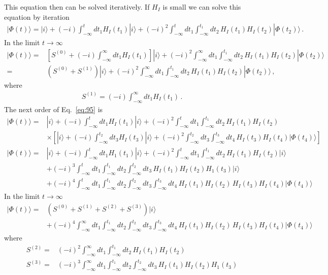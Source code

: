 This equation then can  be solved iteratively. If $H_I$ is small we can solve this equation by iteration
\begin{align}
\label{eq:95}
  |\Phi(t)\rangle=|i\rangle+(-i)\int_{-\infty}^t d t_1 H_I(t_1)|i\rangle+(-i)^2\int_{-\infty}^t d t_1\int_{-\infty}^{t_1} d t_2\,H_I(t_1)H_I(t_2)|\Phi(t_2)\rangle\,.
\end{align}
In the limit $t\to\infty$
\begin{align}
  |\Phi(t)\rangle=&\left[S^{(0)}+(-i)\int_{-\infty}^\infty d t_1 H_I(t_1)\right]|i\rangle+(-i)^2\int_{-\infty}^\infty d t_1\int_{-\infty}^{t_1} d t_2\,H_I(t_1)H_I(t_2)|\Phi(t_2)\rangle\nonumber\\
  =&\left(S^{(0)}+S^{(1)}\right)|i\rangle+(-i)^2\int_{-\infty}^\infty d t_1\int_{-\infty}^{t_1} d t_2\,H_I(t_1)H_I(t_2)|\Phi(t_2)\rangle\,,
\end{align}
where 
\begin{align}
  S^{(1)}=(-i)\int_{-\infty}^\infty d t_1 H_I(t_1)\,.
\end{align}
The next order of Eq.~\eqref{eq:95} is
\begin{align}
  |\Phi(t)\rangle=&|i\rangle+(-i)\int_{-\infty}^t d t_1 H_I(t_1)|i\rangle+(-i)^2\int_{-\infty}^t d t_1\int_{-\infty}^{t_1} d t_2\,H_I(t_1)H_I(t_2)\nonumber\\
  &\times\left[|i\rangle+(-i)\int_{-\infty}^{t_2} d t_3 H_I(t_3)|i\rangle+(-i)^2\int_{-\infty}^{t_2} d t_3\int_{-\infty}^{t_3} d t_4\,H_I(t_3)H_I(t_4)|\Phi(t_4)\rangle\right]
\end{align}
\begin{align}
  |\Phi(t)\rangle=&|i\rangle+(-i)\int_{-\infty}^t d t_1 H_1(t_1)|i\rangle+(-i)^2\int_{-\infty}^t d t_1\int_{-\infty}^{t_1} d t_2\,H_I(t_1)H_I(t_2)|i\rangle\nonumber\\
  &+(-i)^3\int_{-\infty}^t d t_1\int_{-\infty}^{t_1} d t_2\int_{-\infty}^{t_2} d t_3\,H_I(t_1)H_I(t_2) H_1(t_3)|i\rangle\nonumber\\
  &+(-i)^4\int_{-\infty}^t d t_1\int_{-\infty}^{t_1}d t_2 \int_{-\infty}^{t_2} d t_3\int_{-\infty}^{t_3}d t_4 \,H_I(t_1)H_I(t_2)\,H_I(t_3)H_I(t_4)|\Phi(t_4)\rangle
\end{align}
In the limit $t\to\infty$
\begin{align}
  |\Phi(t)\rangle=&\left(S^{(0)}+S^{(1)}+S^{(2)}+S^{(3)}\right)|i\rangle\nonumber\\
  &+(-i)^4\int_{-\infty}^\infty d t_1\int_{-\infty}^{t_1}d t_2 \int_{-\infty}^{t_2} d t_3\int_{-\infty}^{t_3}d t_4 \,H_I(t_1)H_I(t_2)\,H_I(t_3)H_I(t_4)|\Phi(t_4)\rangle
\end{align}
where
\begin{align}
  S^{(2)}=&(-i)^2\int_{-\infty}^\infty d t_1\int_{-\infty}^{t_1} d t_2\,H_I(t_1)H_I(t_2)\nonumber\\
  S^{(3)}=&(-i)^3\int_{-\infty}^\infty d t_1\int_{-\infty}^{t_1} d t_2\int_{-\infty}^{t_2} d t_3\,H_I(t_1)H_I(t_2) H_1(t_3)
\end{align}

